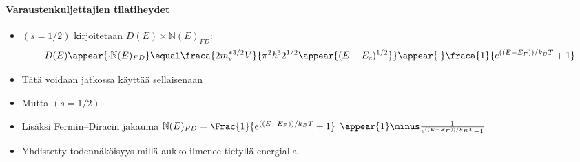\begin{frame}
\frametitle{\texorpdfstring{\culine[\sectiontitleulinecolor]{\sectiontitle}}{\sectiontitle} }
\framesubtitle{Varaustenkuljettajien tilatiheydet}
\appear{}

\begin{itemize}
	\item {} $(s=1 / 2)$ kirjoitetaan $D(E) \times  \mathbb{N} (E)_{F D}$:
\[
D(E) \appear{\cdot  \mathbb{N} (E)_{F D}} \equal \fraca{2 m_{e}^{* 3 / 2} V}{\pi^{2} \hbar^{3} 2^{1/2} \appear{(E-E_{c})^{1/2}}} \appear{\cdot} \fraca{1}{e^{ \textrm{((}E-E_{F} \textrm{))} / k_{B} T}+1}
\]
\item[] Tätä voidaan jatkossa käyttää sellaisenaan

\item Mutta  $(s=1 / 2)$

\item Lisäksi Fermin–Diracin jakauma $  \mathbb{N} (E)_{F D}=\Frac{1}{e^{ \textrm{((}E-E_{F} \textrm{))} / k_{B} T}+1}$
 $\appear{1}  \minus  \frac{1}{e^{ \textrm{((}E-E_{F} \textrm{))} / k_{B} T}+1}$

\item Yhdistetty todennäköisyys millä aukko ilmenee tietyllä energialla 
\end{itemize}

\endofslide 
\end{frame}

